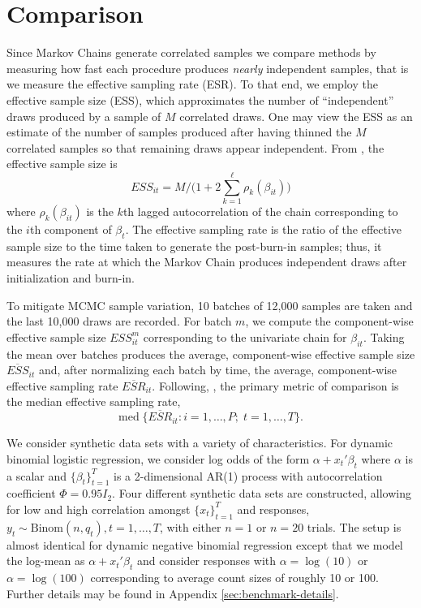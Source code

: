 \documentclass[12pt]{article}
\begin{document}
\section{Comparison}


Since Markov Chains generate correlated samples we compare methods by measuring
how fast each procedure produces \emph{nearly} independent samples, that is we
measure the effective sampling rate (ESR).  To that end, we employ the effective
sample size (ESS), which approximates the number of ``independent'' draws
produced by a sample of $M$ correlated draws.  One may view the ESS as an
estimate of the number of samples produced after having thinned the $M$
correlated samples so that remaining draws appear independent.  From
\cite{holmes-held-2006}, the effective sample size is
\[
ESS_{it} = M / \Big( 1 + 2 \sum_{k=1}^\ell \rho_k(\beta_{it}) \Big)
\]
where $\rho_k(\beta_{it})$ is the $k$th lagged autocorrelation of the chain
corresponding to the $i$th component of $\beta_t$.  The effective
sampling rate is the ratio of the effective sample size to the time taken to
generate the post-burn-in samples; thus, it measures the rate at which the
Markov Chain produces independent draws after initialization and burn-in.

To mitigate MCMC sample variation, 10 batches of 12,000 samples are taken and
the last 10,000 draws are recorded.  For batch $m$, we compute the
component-wise effective sample size $ESS_{it}^{m}$ corresponding to the
univariate chain for $\beta_{it}$.  Taking the mean over batches produces the
average, component-wise effective sample size $\overline{ESS}_{it}$ and, after
normalizing each batch by time, the average, component-wise effective sampling
rate $\overline{ESR}_{it}$.  Following,
\cite{fruhwirth-schnatter-fruhwirth-2010}, the primary metric of comparison is
the median effective sampling rate,
\[
\text{med} \; \Big\{ \overline{ESR}_{it} : i=1, \ldots, P; \;  t=1, \ldots, T \Big\}.
\]

We consider synthetic data sets with a variety of characteristics.
For dynamic binomial logistic regression, we consider log odds of the form
$\alpha + x_t' \beta_t$ where $\alpha$ is a scalar and $\{\beta_t\}_{t=1}^T$ is
a 2-dimensional AR(1) process with autocorrelation coefficient $\Phi = 0.95
I_2$.  Four different synthetic data sets are constructed, allowing for low and
high correlation amongst $\{x_t\}_{t=1}^T$ and responses, $y_t \sim
\text{Binom}(n, q_t), t=1, \ldots, T$, with either $n=1$ or $n=20$ trials.  The
setup is almost identical for dynamic negative binomial regression except that
we model the log-mean as $\alpha + x_t' \beta_t$ and consider responses with
$\alpha = \log(10)$ or $\alpha = \log(100)$ corresponding to average count sizes
of roughly 10 or 100.  Further details may be found in Appendix
\ref{sec:benchmark-details}.
\end{document}
